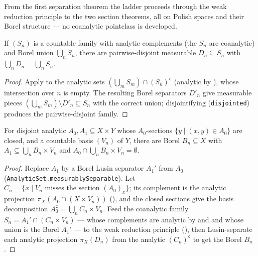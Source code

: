 From the first separation theorem the ladder proceeds through the weak reduction principle to the
two section theorems, all on Polish spaces and their Borel structure --- no coanalytic pointclass
is developed.

\begin{theorem}\label{thm:dst-weak-reduction}
  \leanok
  If \((S_n)\) is a countable family with analytic complements (the \(S_n\) are coanalytic) and
  Borel union \(\bigcup_n S_n\), there are pairwise-disjoint measurable \(D_n\subseteq S_n\) with
  \(\bigcup_n D_n=\bigcup_n S_n\).
\end{theorem}
\begin{proof}\leanok
  Apply  to the analytic sets \((\bigcup_m S_m)\cap(S_n)^{\mathsf c}\)
  (analytic by ), whose intersection over \(n\) is empty. The resulting Borel
  separators \(D'_n\) give measurable pieces \((\bigcup_m S_m)\setminus D'_n\subseteq S_n\) with the
  correct union; disjointifying (\texttt{disjointed}) produces the pairwise-disjoint family.
\end{proof}

\begin{theorem}\label{thm:dst-saint-raymond}
  \leanok
  For disjoint analytic \(A_0,A_1\subseteq X\times Y\) whose \(A_0\)-sections \(\{y\mid(x,y)\in
  A_0\}\) are closed, and a countable basis \((V_n)\) of \(Y\), there are Borel \(B_n\subseteq X\)
  with \(A_1\subseteq\bigcup_n B_n\times V_n\) and \(A_0\cap\bigcup_n B_n\times V_n=\emptyset\).
\end{theorem}
\begin{proof}\leanok
  Replace \(A_1\) by a Borel Lusin separator \(A_1'\) from \(A_0\)
  (\texttt{AnalyticSet.measurablySeparable}). Let \(C_n=\{x\mid V_n\text{ misses the section
  }(A_0)_x\}\); its complement is the analytic projection \(\pi_X(A_0\cap(X\times V_n))\)
  (), and the closed sections give the basis decomposition
  \(A_0^{\mathsf c}=\bigcup_n C_n\times V_n\). Feed the coanalytic family
  \(S_n=A_1'\cap(C_n\times V_n)\) --- whose complements are analytic by  and
   and whose union is the Borel \(A_1'\) --- to the weak reduction principle
  (), then Lusin-separate each analytic projection \(\pi_X(D_n)\) from
  the analytic \((C_n)^{\mathsf c}\) to get the Borel \(B_n\).
\end{proof}

